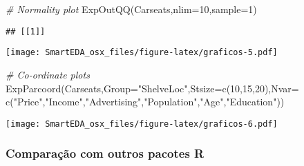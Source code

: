 \documentclass[
]{article}
\newenvironment{Shaded}{\begin{snugshade}}{\end{snugshade}}
\newcommand{\AttributeTok}[1]{\textcolor[rgb]{0.77,0.63,0.00}{#1}}
\newcommand{\CommentTok}[1]{\textcolor[rgb]{0.56,0.35,0.01}{\textit{#1}}}
\newcommand{\DecValTok}[1]{\textcolor[rgb]{0.00,0.00,0.81}{#1}}
\newcommand{\FunctionTok}[1]{\textcolor[rgb]{0.00,0.00,0.00}{#1}}
\newcommand{\NormalTok}[1]{#1}
\newcommand{\StringTok}[1]{\textcolor[rgb]{0.31,0.60,0.02}{#1}}
\begin{document}
\begin{Shaded}
\begin{Highlighting}[]
\CommentTok{\# Normality plot}
\FunctionTok{ExpOutQQ}\NormalTok{(Carseats,}\AttributeTok{nlim=}\DecValTok{10}\NormalTok{,}\AttributeTok{sample=}\DecValTok{1}\NormalTok{)}
\end{Highlighting}
\end{Shaded}

\begin{verbatim}
## [[1]]
\end{verbatim}

\texttt{[image: SmartEDA\_osx\_files/figure-latex/graficos-5.pdf]}

\begin{Shaded}
\begin{Highlighting}[]
\CommentTok{\# Co{-}ordinate plots}
\FunctionTok{ExpParcoord}\NormalTok{(Carseats,}\AttributeTok{Group=}\StringTok{"ShelveLoc"}\NormalTok{,}\AttributeTok{Stsize=}\FunctionTok{c}\NormalTok{(}\DecValTok{10}\NormalTok{,}\DecValTok{15}\NormalTok{,}\DecValTok{20}\NormalTok{),}\AttributeTok{Nvar=}
                 \FunctionTok{c}\NormalTok{(}\StringTok{"Price"}\NormalTok{,}\StringTok{"Income"}\NormalTok{,}\StringTok{"Advertising"}\NormalTok{,}\StringTok{"Population"}\NormalTok{,}\StringTok{"Age"}\NormalTok{,}\StringTok{"Education"}\NormalTok{))}
\end{Highlighting}
\end{Shaded}

\texttt{[image: SmartEDA\_osx\_files/figure-latex/graficos-6.pdf]}

\hypertarget{comparauxe7uxe3o-com-outros-pacotes-r}{%
\subsubsection{Comparação com outros pacotes
R}\label{comparauxe7uxe3o-com-outros-pacotes-r}}
\end{document}
